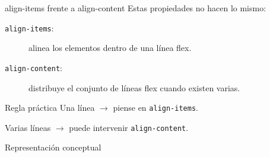 \documentclass[aspectratio=169,11.5pt]{beamer}
\begin{document}
    \begin{frame}{align-items frente a align-content}
        Estas propiedades no hacen lo mismo:

        \begin{description}
            \item[\texttt{align-items}:]
            alinea los elementos dentro de una línea flex.

            \item[\texttt{align-content}:]
            distribuye el conjunto de líneas flex
            cuando existen varias.
        \end{description}

        \begin{alertblock}{Regla práctica}
            Una línea $\rightarrow$ piense en \texttt{align-items}.

            Varias líneas $\rightarrow$ puede intervenir
            \texttt{align-content}.
        \end{alertblock}
    \end{frame}

    \begin{frame}{Representación conceptual}
        \begin{center}
        \end{center}
    \end{frame}
\end{document}
